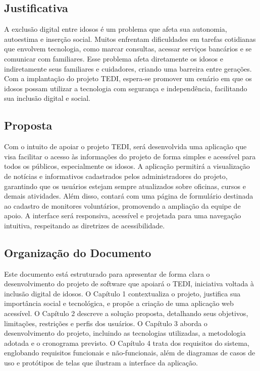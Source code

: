 \documentclass[a4paper,12pt]{article}
\begin{document}
\subsection{Justificativa}
A exclusão digital entre idosos é um problema que afeta sua autonomia, autoestima e inserção social. Muitos enfrentam dificuldades em tarefas cotidianas que envolvem tecnologia, como marcar consultas, acessar serviços bancários e se comunicar com familiares. Esse problema afeta diretamente os idosos e indiretamente seus familiares e cuidadores, criando uma barreira entre gerações. Com a implantação do projeto TEDI, espera-se promover um cenário em que os idosos possam utilizar a tecnologia com segurança e independência, facilitando sua inclusão digital e social.

\subsection{Proposta}
Com o intuito de apoiar o projeto TEDI, será desenvolvida uma aplicação que visa facilitar o acesso às informações do projeto de forma simples e acessível para todos os públicos, especialmente os idosos. A aplicação permitirá a visualização de notícias e informativos cadastrados pelos administradores do projeto, garantindo que os usuários estejam sempre atualizados sobre oficinas, cursos e demais atividades. Além disso, contará com uma página de formulário destinada ao cadastro de monitores voluntários, promovendo a ampliação da equipe de apoio. A interface será responsiva, acessível e projetada para uma navegação intuitiva, respeitando as diretrizes de acessibilidade.


\subsection{Organização do Documento}

Este documento está estruturado para apresentar de forma clara o desenvolvimento do projeto de software que apoiará o TEDI, iniciativa voltada à inclusão digital de idosos. O Capítulo 1 contextualiza o projeto, justifica sua importância social e tecnológica, e propõe a criação de uma aplicação web acessível. O Capítulo 2 descreve a solução proposta, detalhando seus objetivos, limitações, restrições e perfis dos usuários. O Capítulo 3 aborda o desenvolvimento do projeto, incluindo as tecnologias utilizadas, a metodologia adotada e o cronograma previsto. O Capítulo 4 trata dos requisitos do sistema, englobando requisitos funcionais e não-funcionais, além de diagramas de casos de uso e protótipos de telas que ilustram a interface da aplicação.
\end{document}
